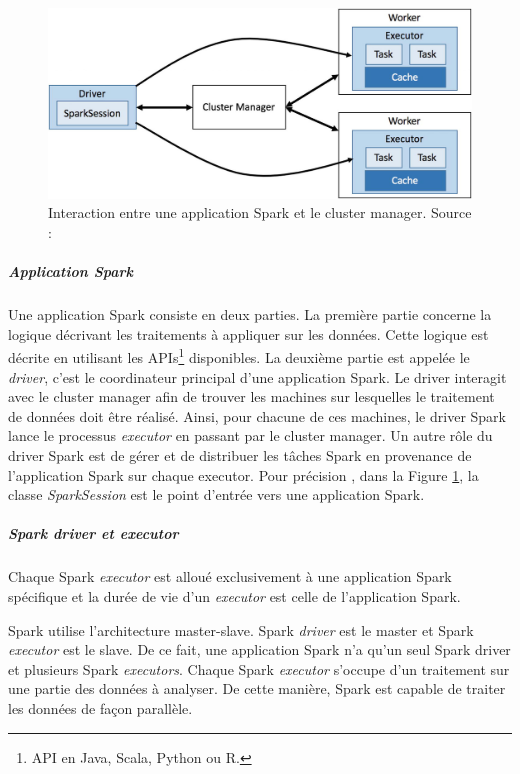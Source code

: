\begin{figure}[H]
	\centering
	\captionsetup{justification= centering}
	\includegraphics[width=0.7\linewidth]{illustrations/cluster-overview.jpg}
	\caption{ Interaction entre une application Spark et le cluster manager. Source : \cite{eginning-Apache-Spark-2-cluster-overwiew}}
	\label{fig:cluster-overview}
\end{figure}




\subparagraph{Application Spark} \label{sparkpresentationsection}
Une application Spark consiste en deux parties. La première partie concerne la logique décrivant les traitements à appliquer sur les données.  Cette logique est décrite en utilisant les APIs\footnote{API en Java, Scala, Python ou R.} disponibles. La deuxième partie est appelée le \textit{driver}, c'est le coordinateur principal d'une application Spark. Le driver interagit avec le cluster manager afin de trouver les machines sur lesquelles le traitement de données doit être réalisé. Ainsi, pour chacune de ces machines, le driver Spark lance le processus \textit{executor} en passant par le cluster manager. Un autre rôle du  driver Spark est de gérer et de distribuer les tâches Spark en provenance de l'application Spark sur chaque executor. Pour précision , dans la Figure \ref{fig:cluster-overview}, la classe \textit{SparkSession} est le point d'entrée vers une application Spark.

\subparagraph{Spark driver et executor}

Chaque Spark \textit{executor} est alloué exclusivement à une application Spark spécifique et la durée de vie d'un \textit{executor} est celle de l'application Spark. 

Spark utilise l'architecture master-slave. Spark \textit{driver} est le master et Spark \textit{executor} est le slave. De ce fait, une application Spark n'a qu'un seul Spark driver et plusieurs Spark \textit{executors}. Chaque Spark \textit{executor} s'occupe d'un traitement  sur une partie  des données à analyser. De cette manière,  Spark est capable de traiter  les données de façon parallèle. 


